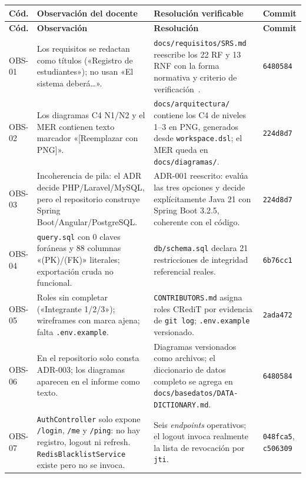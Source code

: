 \documentclass[11pt,a4paper]{article}
\newcommand{\ruta}[1]{\texttt{\footnotesize #1}}
\begin{document}
\renewcommand{\arraystretch}{1.25}
\begin{longtable}{@{}p{1.3cm}p{6.6cm}p{5.3cm}p{1.6cm}@{}}
\toprule
\textbf{Cód.} & \textbf{Observación del docente} & \textbf{Resolución verificable} & \textbf{Commit} \\
\midrule
\endfirsthead
\toprule
\textbf{Cód.} & \textbf{Observación} & \textbf{Resolución} & \textbf{Commit} \\
\midrule
\endhead

OBS-01 & Los requisitos se redactan como títulos («Registro de
estudiantes»); no usan «El sistema deberá\ldots». &
\ruta{docs/requisitos/SRS.md} reescribe los 22 RF y 13 RNF con la forma
normativa y criterio de verificación~\cite{iso29148}. & \texttt{6480584} \\

OBS-02 & Los diagramas C4 N1/N2 y el MER contienen texto marcador
«[Reemplazar con PNG]». & \ruta{docs/arquitectura/} contiene los C4 de
niveles 1--3 en PNG, generados desde \texttt{workspace.dsl}; el MER queda
en \ruta{docs/diagramas/}. & \texttt{224d8d7} \\

OBS-03 & Incoherencia de pila: el ADR decide PHP/Laravel/MySQL, pero el
repositorio construye Spring Boot/Angular/PostgreSQL. & ADR-001 reescrito:
evalúa las tres opciones y decide explícitamente Java 21 con Spring Boot
3.2.5, coherente con el código. & \texttt{224d8d7} \\

OBS-04 & \texttt{query.sql} con 0 claves foráneas y 88 columnas
«(PK)/(FK)» literales; exportación cruda no funcional. & \ruta{db/schema.sql}
declara 21 restricciones de integridad referencial reales. &
\texttt{6b76cc1} \\

OBS-05 & Roles sin completar («Integrante 1/2/3»); wireframes con marca
ajena; falta \texttt{.env.example}. & \ruta{CONTRIBUTORS.md} asigna roles
CRediT por evidencia de \texttt{git log}; \ruta{.env.example} versionado. &
\texttt{2ada472} \\

OBS-06 & En el repositorio solo consta ADR-003; los diagramas aparecen en
el informe como texto. & Diagramas versionados como archivos; el
diccionario de datos completo se agrega en
\ruta{docs/basedatos/DATA-DICTIONARY.md}. & \texttt{6480584} \\

OBS-07 & \texttt{AuthController} solo expone \texttt{/login},
\texttt{/me} y \texttt{/ping}: no hay registro, logout ni refresh.
\texttt{RedisBlacklistService} existe pero no se invoca. & Seis
\emph{endpoints} operativos; el logout invoca realmente la lista de
revocación por \texttt{jti}. & \texttt{048fca5}, \texttt{c506309} \\


\end{longtable}
\end{document}
